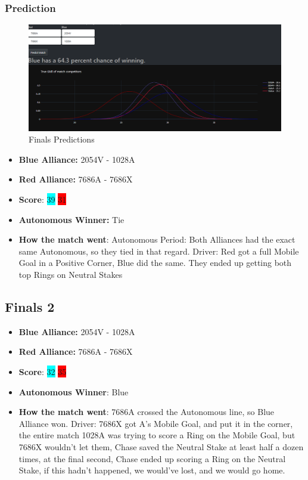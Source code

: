 \subsubsection*{Prediction}
\begin{figure}[H]
    \centering
    \includegraphics[width=0.8\linewidth]{images/FND.png}
    \caption{Finals Predictions}
    \label{fig:enter-label}
\end{figure}
\begin{itemize}
    \item \textbf{Blue Alliance:} 2054V - 1028A
    \item \textbf{Red Alliance:} 7686A - 7686X
    \item \textbf{Score}: \colorbox{cyan}{39}
    \colorbox{red}{31}
    \item \textbf{Autonomous Winner:} Tie
    \item \textbf{How the match went}: Autonomous Period: Both Alliances had the exact same Autonomous, so they tied in that regard. Driver: Red got a full Mobile Goal in a Positive Corner, Blue did the same. They ended up getting both top Rings on Neutral Stakes
\end{itemize}
\subsection*{Finals 2}

\begin{itemize}
    \item \textbf{Blue Alliance:} 2054V - 1028A
    \item \textbf{Red Alliance:} 7686A - 7686X
    \item \textbf{Score}: \colorbox{cyan}{32}
    \colorbox{red}{35}
    \item \textbf{Autonomous Winner}: Blue
    \item \textbf{How the match went}: 7686A crossed the Autonomous line, so Blue Alliance won. Driver: 7686X got A's Mobile Goal, and put it in the corner, the entire match 1028A was trying to score a Ring on the Mobile Goal, but 7686X wouldn't let them, Chase saved the Neutral Stake at least half a dozen times, at the final second, Chase ended up scoring a Ring on the Neutral Stake, if this hadn't happened, we would've lost, and we would go home.
\end{itemize}
